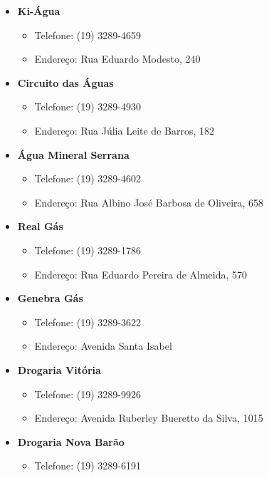 \begin{itemize}
\item  \textbf{Ki-Água}
\begin{itemize}
\item  Telefone: (19) 3289-4659
\item  Endereço: Rua Eduardo Modesto, 240
\end{itemize}

\item  \textbf{Circuito das Águas}
\begin{itemize}
\item  Telefone: (19) 3289-4930
\item  Endereço: Rua Júlia Leite de Barros, 182
\end{itemize}

\item  \textbf{Água Mineral Serrana}
\begin{itemize}
\item  Telefone: (19) 3289-4602
\item  Endereço: Rua Albino José Barbosa de Oliveira, 658
\end{itemize}

\item  \textbf{Real Gás}
\begin{itemize}
\item  Telefone: (19) 3289-1786
\item  Endereço: Rua Eduardo Pereira de Almeida, 570
\end{itemize}

\item  \textbf{Genebra Gás}
\begin{itemize}
\item  Telefone: (19) 3289-3622
\item  Endereço: Avenida Santa Isabel
\end{itemize}

\item  \textbf{Drogaria Vitória}
\begin{itemize}
\item  Telefone: (19) 3289-9926
\item  Endereço: Avenida Ruberley Bueretto da Silva, 1015
\end{itemize}

\item  \textbf{Drogaria Nova Barão}
\begin{itemize}
\item  Telefone: (19) 3289-6191
\end{itemize}


\end{itemize}
